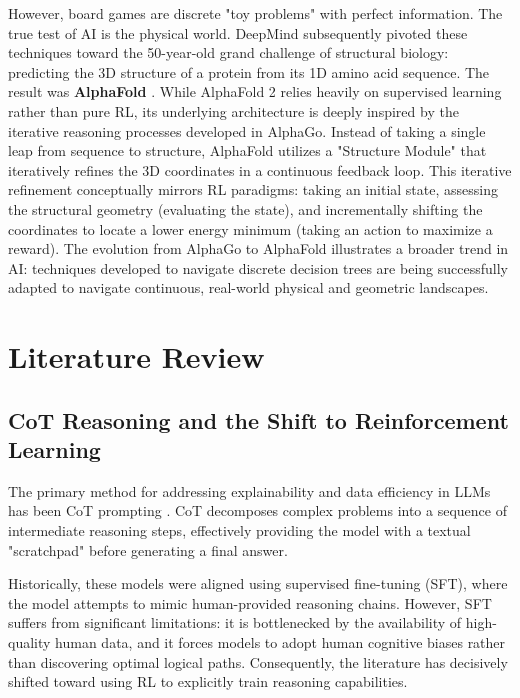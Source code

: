 \documentclass{l4proj}
\begin{document}
However, board games are discrete "toy problems" with perfect information. The true test of AI is the physical world. DeepMind subsequently pivoted these techniques toward the 50-year-old grand challenge of structural biology: predicting the 3D structure of a protein from its 1D amino acid sequence. The result was \textbf{AlphaFold} \citep{jumper2021highly}. While AlphaFold 2 relies heavily on supervised learning rather than pure RL, its underlying architecture is deeply inspired by the iterative reasoning processes developed in AlphaGo. Instead of taking a single leap from sequence to structure, AlphaFold utilizes a "Structure Module" that iteratively refines the 3D coordinates in a continuous feedback loop. This iterative refinement conceptually mirrors RL paradigms: taking an initial state, assessing the structural geometry (evaluating the state), and incrementally shifting the coordinates to locate a lower energy minimum (taking an action to maximize a reward). The evolution from AlphaGo to AlphaFold illustrates a broader trend in AI: techniques developed to navigate discrete decision trees are being successfully adapted to navigate continuous, real-world physical and geometric landscapes.



\section{Literature Review}

\subsection{CoT Reasoning and the Shift to Reinforcement Learning}
The primary method for addressing explainability and data efficiency in LLMs has been CoT prompting \citep{wei2022chain}. CoT decomposes complex problems into a sequence of intermediate reasoning steps, effectively providing the model with a textual "scratchpad" before generating a final answer.

Historically, these models were aligned using supervised fine-tuning (SFT), where the model attempts to mimic human-provided reasoning chains. However, SFT suffers from significant limitations: it is bottlenecked by the availability of high-quality human data, and it forces models to adopt human cognitive biases rather than discovering optimal logical paths. Consequently, the literature has decisively shifted toward using RL to explicitly train reasoning capabilities.
\end{document}
